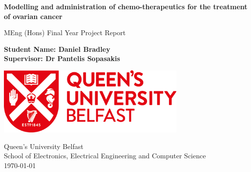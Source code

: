 \begin{titlepage}
	\begin{center}
        \vspace*{1cm}
            
        \Huge
        \textbf{Modelling and administration of chemo-therapeutics for the treatment of ovarian cancer}
            
        \vspace{0.5cm}
        \Huge
        MEng (Hons) Final Year Project Report
            
        \vspace{1.5cm}
        
        \Large    
        \textbf{Student Name: Daniel Bradley}\\
        \textbf{Supervisor: Dr Pantelis Sopasakis}
            
        \vfill
        
        \includegraphics[width=0.7\textwidth]{Images/University_Logo}
            
        \vspace{3.0cm}
            
        \Large
        Queen's University Belfast\\
        School of Electronics, Electrical Engineering and Computer Science\\
        \today\\
        
    \end{center}
\end{titlepage}